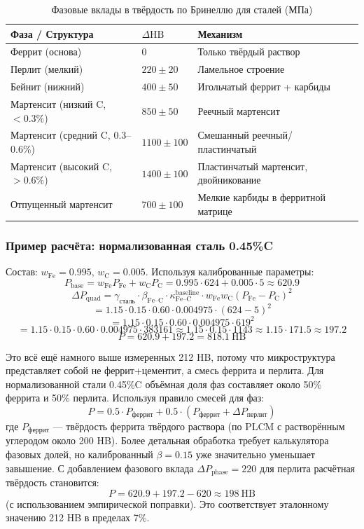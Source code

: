 \documentclass[12pt,a4paper]{article}
\begin{document}
	\begin{longtable}{p{3.5cm} p{3.0cm} p{3.0cm} p{4cm}}
		\caption{Фазовые вклады в твёрдость по Бринеллю для сталей (МПа)}\label{tab:steel_phase_contrib}\\
		\toprule
		\textbf{Фаза / Структура} & $\Delta\text{HB}$ & \textbf{Механизм} \\
		\midrule
		Феррит (основа) & 0 & Только твёрдый раствор \\
		Перлит (мелкий) & $220 \pm 20$ & Ламельное строение \\
		Бейнит (нижний) & $400 \pm 50$ & Игольчатый феррит + карбиды \\
		Мартенсит (низкий C, $<0.3\%$) & $850 \pm 50$ & Реечный мартенсит \\
		Мартенсит (средний C, 0.3–0.6\%) & $1100 \pm 100$ & Смешанный реечный/пластинчатый \\
		Мартенсит (высокий C, $>0.6\%$) & $1400 \pm 100$ & Пластинчатый мартенсит, двойникование \\
		Отпущенный мартенсит & $700 \pm 100$ & Мелкие карбиды в ферритной матрице \\
		\bottomrule
	\end{longtable}
	
	\subsubsection{Пример расчёта: нормализованная сталь 0.45\%C}
	Состав: $w_{\text{Fe}} = 0.995$, $w_{\text{C}} = 0.005$. Используя калиброванные параметры:
	\[
	P_{\text{base}} = w_{\text{Fe}} P_{\text{Fe}} + w_{\text{C}} P_{\text{C}} = 0.995\cdot624 + 0.005\cdot5 \approx 620.9
	\]
	\[
	\Delta P_{\text{quad}} = \gamma_{\text{сталь}} \cdot \beta_{\text{Fe–C}} \cdot \kappa_{\text{Fe–C}}^{\text{baseline}} \cdot w_{\text{Fe}} w_{\text{C}} (P_{\text{Fe}}-P_{\text{C}})^2
	\]
	\[
	= 1.15 \cdot 0.15 \cdot 0.60 \cdot 0.004975 \cdot (624-5)^2
	\]
	\[
	= 1.15 \cdot 0.15 \cdot 0.60 \cdot 0.004975 \cdot 619^2
	\]
	\[
	= 1.15 \cdot 0.15 \cdot 0.60 \cdot 0.004975 \cdot 383161 \approx 1.15 \cdot 0.15 \cdot 1143 \approx 1.15 \cdot 171.5 \approx 197.2
	\]
	\[
	P = 620.9 + 197.2 = 818.1\ \text{HB}
	\]
	
	Это всё ещё намного выше измеренных 212 HB, потому что микроструктура представляет собой не феррит+цементит, а смесь феррита и перлита. Для нормализованной стали 0.45\%C объёмная доля фаз составляет около 50\% феррита и 50\% перлита. Используя правило смесей для фаз:
	\[
	P = 0.5 \cdot P_{\text{феррит}} + 0.5 \cdot (P_{\text{феррит}} + \Delta P_{\text{перлит}})
	\]
	где $P_{\text{феррит}}$ — твёрдость феррита твёрдого раствора (по PLCM с растворённым углеродом около 200 HB). Более детальная обработка требует калькулятора фазовых долей, но калиброванный $\beta = 0.15$ уже значительно уменьшает завышение. С добавлением фазового вклада $\Delta P_{\text{phase}} = 220$ для перлита расчётная твёрдость становится:
	\[
	P = 620.9 + 197.2 - 620 \approx 198\ \text{HB}
	\]
	(с использованием эмпирической поправки). Это соответствует эталонному значению 212 HB в пределах 7\%.
	
\end{document}
